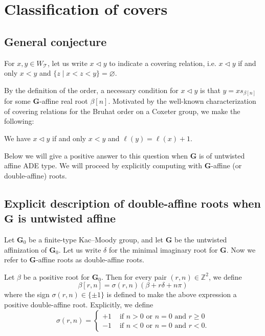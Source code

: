 \documentclass[ALCO,ThmDefs,Unicode]{cedram}
\newcommand{\bG}{\mathbf{G}}
\newcommand{\cT}{\mathcal{T}}
\newcommand{\ZZ}{\mathbb{Z}}
\newcommand{\suchthat}{\mid}
\newcommand{\WTits}{W_{\TitsCone}}
\newcommand{\TitsCone}{\cT}
\newcommand{\textif}{\text{ if }}
\newcommand{\textand}{\text{ and }}
\newcommand{\textor}{\text{ or }}
\begin{document}
\section{Classification of covers}

\subsection{General conjecture}

For $x,y \in \WTits$, let us write $x\lhd y$ to indicate a covering relation, i.e. $x\lhd y$ if and only $x<y$ and $\{z \suchthat x<z<y\}=\varnothing$.

By the definition of the order, a necessary condition for $ x \lhd y$ is that $y = x s_{\beta[n]}$ for some $\bG$-affine real root $\beta[n]$. Motivated by the well-known characterization of covering relations for the Bruhat order on a Coxeter group, we make the following:

\begin{conj}\label{conj:covers}
We have $x\lhd y$ if and only $ x < y$ and $\ell(y)=\ell(x)+1$.
\end{conj}

Below we will give a positive answer to this question when $\bG$ is of untwisted affine ADE type. We will proceed by explicitly computing with $\bG$-affine (or double-affine) roots.

\subsection{Explicit description of double-affine roots when \texorpdfstring{$\bG$}{G} is untwisted affine}

Let $\bG_0$ be a finite-type Kac--Moody group, and let $\bG$ be the untwisted affinization of $\bG_0$. Let us write $\delta$ for the minimal imaginary root for $\bG$. Now we refer to $\bG$-affine roots as double-affine roots.

Let $\beta$ be a positive root for $\bG_0$. Then for every pair $(r,n) \in \ZZ^2$, we define
\begin{equation}
\beta[r,n] = \sigma(r,n)(\beta + r\delta + n \pi)
\end{equation}
where the sign $\sigma(r,n) \in \{\pm1\}$ is defined to make the above expression a positive double-affine root. Explicitly, we define
\begin{equation}
\sigma(r,n) =
\begin{cases}
+1 & \textif n > 0 \textor n=0 \textand r\geq0 \\
-1 & \textif n < 0 \textor n=0 \textand r<0.
\end{cases}
\end{equation}
\end{document}
